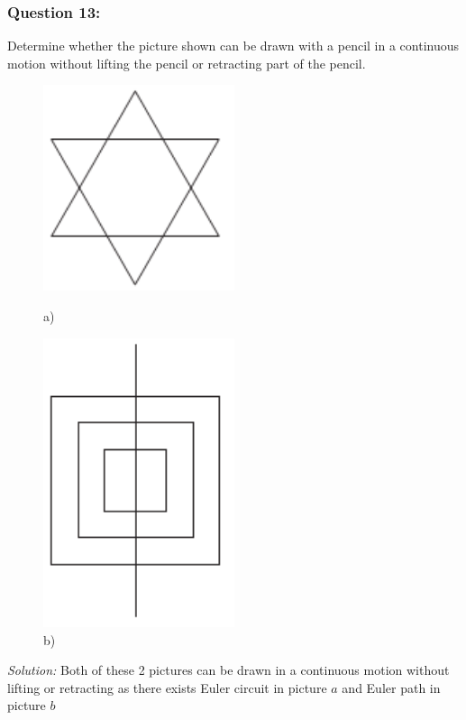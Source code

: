 \documentclass[a4paper]{article}
\begin{document}
	\subsubsection*{Question 13:}
	Determine whether the picture shown can be drawn with a pencil in a continuous motion without lifting the pencil or retracting part of the pencil.
	\begin{figure}[H]
		\begin{minipage}{0.5\textwidth}
			\centering
			\includegraphics[width=0.5\textwidth]{tut913_1.png}
			\caption*{a)}
		\end{minipage}
		\begin{minipage}{0.5\textwidth}
			\centering
			\includegraphics[width=0.5\textwidth]{tut913_2.png}
			\caption*{b)}
		\end{minipage}
	\end{figure}
	\emph{Solution:}
	Both of these 2 pictures can be drawn in a continuous motion without lifting or retracting as there exists Euler circuit in picture $a$ and Euler path in picture $b$
\end{document}
